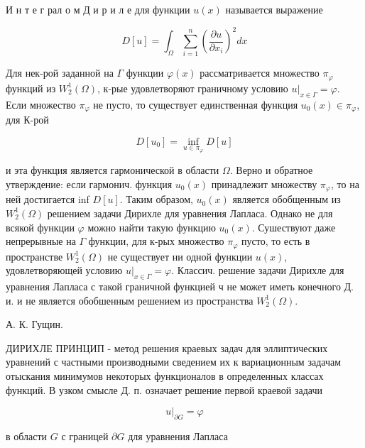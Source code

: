 \documentclass[10pt]{article}
\begin{document}
И н т е г рал о м Д и р и л е для функции $u(x)$ называется выражение



\[

D[u]=\int_{\Omega} \sum_{i=1}^{n}\left(\frac{\partial u}{\partial x_{i}}\right)^{2} d x

\]



Для нек-рой заданной на $\Gamma$ функции $\varphi(x)$ рассматривается множество $\pi_{\varphi}$ функций из $W_{2}^{1}(\Omega)$, к-рые удовлетворяют граничному условию $\left.u\right|_{x \in \Gamma}=\varphi$. Если множество $\pi_{\varphi}$ не пусто, то существует единственная функция $u_{0}(x) \in \pi_{\varphi}$, для К-рой



\[

D\left[u_{0}\right]=\inf _{u \in \pi_{\varphi}} D[u]

\]



и эта функция является гармонической в области $\Omega$. Верно и обратное утверждение: если гармонич. функция $u_{0}(x)$ принадлежит множеству $\pi_{\varphi}$, то на ней достигается inf $D[u]$. Таким образом, $u_{0}(x)$ является обобщенным из $W_{2}^{1}(\Omega)$ решением задачи Дирихле для уравнения Лапласа. Однако не для всякой функции $\varphi$ можно найти такую функцию $u_{0}(x)$. Сушествуют даже непрерывные на $\Gamma$ функции, для к-рых множество $\pi_{\varphi}$ пусто, то есть в пространстве $W_{2}^{1}(\Omega)$ не существует ни одной функции $u(x)$, удовлетворяющей условию $\left.u\right|_{x \in \Gamma}=\varphi$. Классич. решение задачи Дирихле для уравнения Лапласа с такой граничной функцией $ч$ не может иметь конечного Д. и. и не является обобшенным решением из пространства $W_{2}^{1}(\Omega)$.



А. К. Гущин.



ДИРИХЛЕ ПРИНЦИП - метод решения краевых задач для эллиптических уравнений с частными производными сведением их к вариационным задачам отыскания минимумов некоторых функционалов в определенных классах функций. В узком смысле Д. п. означает решение первой краевой задачи



\[

\left.u\right|_{\partial G}=\varphi

\]



в области $G$ с границей $\partial G$ для уравнения Лапласа
\end{document}
